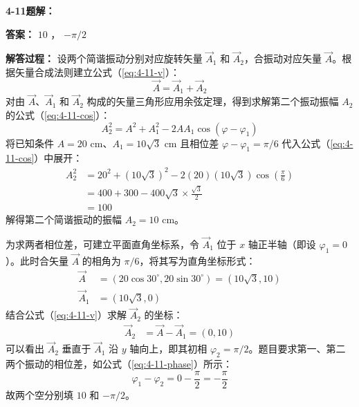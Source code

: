 \vspace{2em}

\textbf{4-11题解： }
\setcounter{equation}{0}

\renewcommand{\theHequation}{4-11.\arabic{equation}}%
\textbf{答案： }
$10$ ， $-\pi/2$

\textbf{解答过程： }
设两个简谐振动分别对应旋转矢量 $\vec{A}_1$ 和 $\vec{A}_2$，合振动对应矢量 $\vec{A}$。根据矢量合成法则建立公式（\ref{eq:4-11-v}）：
\begin{equation}\label{eq:4-11-v}
	\vec{A} = \vec{A}_1 + \vec{A}_2
\end{equation}
对由 $\vec{A}$、$\vec{A}_1$ 和 $\vec{A}_2$ 构成的矢量三角形应用余弦定理，得到求解第二个振动振幅 $A_2$ 的公式（\ref{eq:4-11-cos}）：
\begin{equation}\label{eq:4-11-cos}
	A_2^2 = A^2 + A_1^2 - 2AA_1\cos(\varphi - \varphi_1)
\end{equation}
将已知条件 $A = 20\text{ cm}$、$A_1 = 10\sqrt{3}\text{ cm}$ 且相位差 $\varphi - \varphi_1 = \pi/6$ 代入公式（\ref{eq:4-11-cos}）中展开：
\begin{align*}
	A_2^2 &= 20^2 + (10\sqrt{3})^2 - 2(20)(10\sqrt{3})\cos\left(\frac{\pi}{6}\right) \\
	&= 400 + 300 - 400\sqrt{3} \times \frac{\sqrt{3}}{2} \\
	&= 100
\end{align*}
解得第二个简谐振动的振幅 $A_2 = 10\text{ cm}$。

为求两者相位差，可建立平面直角坐标系，令 $\vec{A}_1$ 位于 $x$ 轴正半轴（即设 $\varphi_1 = 0$）。此时合矢量 $\vec{A}$ 的相角为 $\pi/6$，将其写为直角坐标形式：
\begin{align*}
	\vec{A} &= (20\cos 30^\circ, 20\sin 30^\circ) = (10\sqrt{3}, 10) \\
	\vec{A}_1 &= (10\sqrt{3}, 0)
\end{align*}
结合公式（\ref{eq:4-11-v}）求解 $\vec{A}_2$ 的坐标：
\begin{align*}
	\vec{A}_2 &= \vec{A} - \vec{A}_1 = (0, 10)
\end{align*}
可以看出 $\vec{A}_2$ 垂直于 $\vec{A}_1$ 沿 $y$ 轴向上，即其初相 $\varphi_2 = \pi/2$。题目要求第一、第二两个振动的相位差，如公式（\ref{eq:4-11-phase}）所示：
\begin{equation}\label{eq:4-11-phase}
	\varphi_1 - \varphi_2 = 0 - \frac{\pi}{2} = -\frac{\pi}{2}
\end{equation}
故两个空分别填 $10$ 和 $-\pi/2$。

